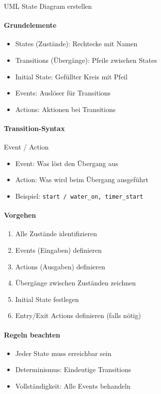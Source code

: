 \begin{KR}{UML State Diagram erstellen}
    \paragraph{Grundelemente}
    \begin{itemize}
        \item States (Zustände): Rechtecke mit Namen
        \item Transitions (Übergänge): Pfeile zwischen States
        \item Initial State: Gefüllter Kreis mit Pfeil
        \item Events: Auslöser für Transitions
        \item Actions: Aktionen bei Transitions
    \end{itemize}
    
    \paragraph{Transition-Syntax}
    Event / Action
    \begin{itemize}
        \item Event: Was löst den Übergang aus
        \item Action: Was wird beim Übergang ausgeführt
        \item Beispiel: \texttt{start / water\_on, timer\_start}
    \end{itemize}
    
    \paragraph{Vorgehen}
    \begin{enumerate}
        \item Alle Zustände identifizieren
        \item Events (Eingaben) definieren
        \item Actions (Ausgaben) definieren
        \item Übergänge zwischen Zuständen zeichnen
        \item Initial State festlegen
        \item Entry/Exit Actions definieren (falls nötig)
    \end{enumerate}
    
    \paragraph{Regeln beachten}
    \begin{itemize}
        \item Jeder State muss erreichbar sein
        \item Determinismus: Eindeutige Transitions
        \item Vollständigkeit: Alle Events behandeln
    \end{itemize}
\end{KR}



